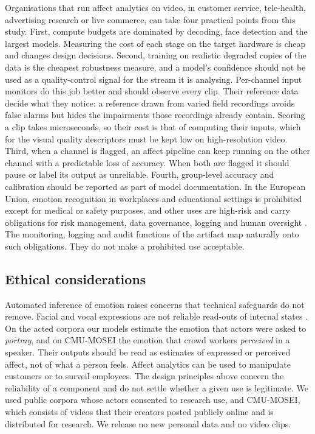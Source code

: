 Organisations that run affect analytics on video, in customer service, tele-health, advertising research or live commerce, can take four practical points from this study. First, compute budgets are dominated by decoding, face detection and the largest models. Measuring the cost of each stage on the target hardware is cheap and changes design decisions. Second, training on realistic degraded copies of the data is the cheapest robustness measure, and a model's confidence should not be used as a quality-control signal for the stream it is analysing. Per-channel input monitors do this job better and should observe every clip. Their reference data decide what they notice: a reference drawn from varied field recordings avoids false alarms but hides the impairments those recordings already contain. Scoring a clip takes microseconds, so their cost is that of computing their inputs, which for the visual quality descriptors must be kept low on high-resolution video. Third, when a channel is flagged, an affect pipeline can keep running on the other channel with a predictable loss of accuracy. When both are flagged it should pause or label its output as unreliable. Fourth, group-level accuracy and calibration should be reported as part of model documentation. In the European Union, emotion recognition in workplaces and educational settings is prohibited except for medical or safety purposes, and other uses are high-risk and carry obligations for risk management, data governance, logging and human oversight \citep{euaiact2024}. The monitoring, logging and audit functions of the artifact map naturally onto such obligations. They do not make a prohibited use acceptable.

\subsection{Ethical considerations}

Automated inference of emotion raises concerns that technical safeguards do not remove. Facial and vocal expressions are not reliable read-outs of internal states \citep{barrett2019}. On the acted corpora our models estimate the emotion that actors were asked to \emph{portray}, and on CMU-MOSEI the emotion that crowd workers \emph{perceived} in a speaker. Their outputs should be read as estimates of expressed or perceived affect, not of what a person feels. Affect analytics can be used to manipulate customers or to surveil employees. The design principles above concern the reliability of a component and do not settle whether a given use is legitimate. We used public corpora whose actors consented to research use, and CMU-MOSEI, which consists of videos that their creators posted publicly online and is distributed for research. We release no new personal data and no video clips.

